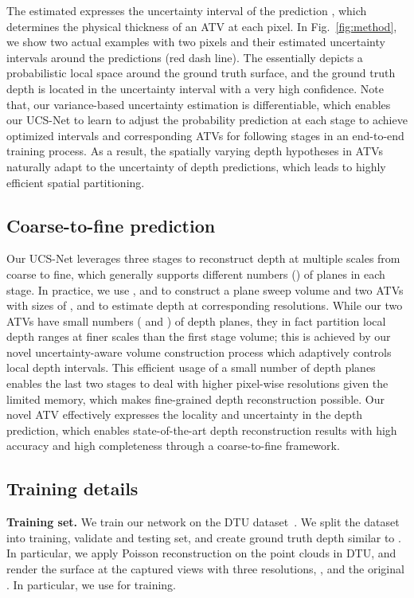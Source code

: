 The estimated  expresses the uncertainty interval of the prediction ,
which determines the physical thickness of an ATV at each pixel.
In Fig.~\ref{fig:method}, 
we show two actual examples with two pixels and their estimated uncertainty intervals  around the predictions (red dash line).
The  essentially depicts a probabilistic local space around the ground truth surface, 
and the ground truth depth is located in the uncertainty interval with a very high confidence. Note that, our variance-based uncertainty estimation is differentiable, 
which enables our UCS-Net to learn to adjust the probability prediction at each stage to 
achieve optimized intervals and corresponding ATVs for following stages in an end-to-end training process.
As a result, the spatially varying depth hypotheses in ATVs naturally adapt to the uncertainty of depth predictions, 
which leads to highly efficient spatial partitioning.



\subsection{Coarse-to-fine prediction}
\label{sec:coarse2fine}
Our UCS-Net leverages three stages to reconstruct depth at multiple scales from coarse to fine, which generally supports different numbers () of planes in each stage.
In practice, we use ,  and  to construct a plane sweep volume and two ATVs 
with sizes of ,  and  to estimate depth at corresponding resolutions.
While our two ATVs have small numbers ( and ) of depth planes,
they in fact partition local depth ranges at finer scales than the first stage volume;
this is achieved by our novel uncertainty-aware volume construction process which adaptively controls local depth intervals.
This efficient usage of a small number of depth planes enables the last two stages to deal with higher pixel-wise resolutions given the limited memory,
which makes fine-grained depth reconstruction possible.
Our novel ATV effectively expresses the locality and uncertainty in the depth prediction, 
which enables state-of-the-art depth reconstruction results with high accuracy and high completeness through a coarse-to-fine framework.


\subsection{Training details}
\label{sec:details}
\noindent\textbf{Training set.} 
We train our network on the DTU dataset~\cite{aanaes2016large}. 
We split the dataset into training, validate and testing set, and create ground truth depth similar to \cite{yao2018mvsnet}.
In particular, we apply Poisson reconstruction \cite{kazhdan2013screened} on the point clouds in DTU, and render the surface at the captured views with three
resolutions, ,  and the original .
In particular, we use  for training.

